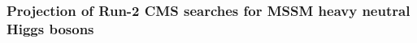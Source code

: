 \subsubsection{Projection of Run-2 CMS searches for MSSM heavy neutral Higgs bosons}\label{sec:CMShtt}






